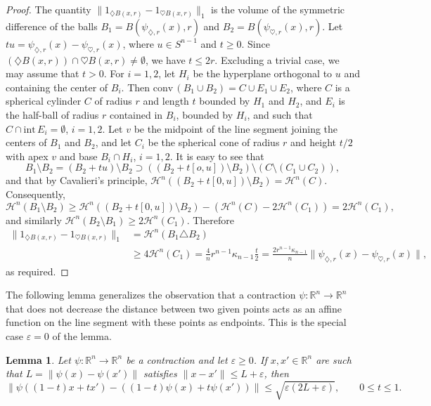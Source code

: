 \documentclass[12pt,reqno]{amsart}
\newcommand{\ee}{\varepsilon}
\newcommand{\R}{{\mathbb R}}
\newcommand{\cH}{{\mathcal H}}
\newtheorem{lem}[thm]{Lemma}
\newcommand{\inte}{{\mathrm{int}}\,}
\newcommand{\conv}{{\mathrm{conv}}\,}
\newcommand{\di}{\diamondsuit}
\numberwithin{equation}{section}
\begin{document}
\begin{proof}
The quantity $\|1_{\di B(x,r)}-1_{\heartsuit B(x,r)}\|_1$ is the volume of the symmetric difference of the balls $B_1=B(\psi_{\di,r}(x),r)$ and $B_2=B(\psi_{\heartsuit,r}(x),r)$. Let $tu=\psi_{\di,r}(x)-\psi_{\heartsuit,r}(x)$, where $u\in S^{n-1}$ and $t\ge 0$. Since $(\di B(x,r))\cap \heartsuit B(x,r)\ne\emptyset$, we have  $t\le 2r$. Excluding a trivial case, we may assume that $t>0$.  For $i=1,2$, let $H_i$ be the hyperplane orthogonal to $u$ and containing the center of $B_i$.  Then $\conv(B_1\cup B_2)=C\cup E_1\cup E_2$, where $C$ is a spherical cylinder $C$ of radius $r$ and length $t$ bounded by $H_1$ and $H_2$, and $E_i$ is the half-ball of radius $r$ contained in $B_i$, bounded by $H_i$, and such that $C\cap\inte E_i=\emptyset$, $i=1,2$.  Let $v$ be the midpoint of the line segment joining the centers of $B_1$ and $B_2$, and let $C_i$ be the spherical cone of radius $r$ and height $t/2$ with apex $v$ and base $B_i\cap H_i$, $i=1,2$.  It is easy to see that
$$B_1\setminus B_2=(B_2+tu)\setminus B_2\supset ((B_2+t[o,u])\setminus B_2)\setminus (C\setminus (C_1\cup C_2)),$$
and that by Cavalieri's principle, $\cH^n((B_2+t[0,u])\setminus B_2)=\cH^n(C)$.  Consequently,
$$
\cH^n(B_1\setminus B_2)\ge  \cH^n((B_2+t[0,u])\setminus B_2)-(\cH^n(C)-2\cH^n(C_1))=2\cH^n(C_1),
$$
and similarly $\cH^n(B_2\setminus B_1)\ge 2\cH^n(C_1)$.  Therefore
\begin{align*}
\|1_{\di B(x,r)}-1_{\heartsuit B(x,r)}\|_1&=\cH^n(B_1\triangle B_2)\\
&\ge 4\cH^n(C_1)=\frac{4}{n}r^{n-1}\kappa_{n-1}\frac{t}{2}
=\frac{2r^{n-1}\kappa_{n-1}}{n }\|\psi_{\di,r}(x)-\psi_{\heartsuit,r}(x)\|,
\end{align*}
as required.
\end{proof}

The following lemma generalizes the observation that a contraction $\psi:\R^n\to \R^n$ that does not decrease the distance between two given points acts as an affine function on the line segment with these points as endpoints. This is the special case $\ee=0$ of the lemma.

\begin{lem}\label{lem_almost_affine}
Let $\psi:\R^n\to \R^n$ be a contraction and let $\ee\ge 0$. If $x,x'\in \R^n$ are such that $L=\|\psi(x)-\psi(x')\|$ satisfies $\|x-x'\|\le L+\ee$, then
\[
\|\psi((1-t)x+tx')-((1-t)\psi(x)+t\psi(x'))\|
\le \sqrt{\ee(2L+\ee)}, \qquad 0\le t\le 1.
\]
\end{lem}
\end{document}

